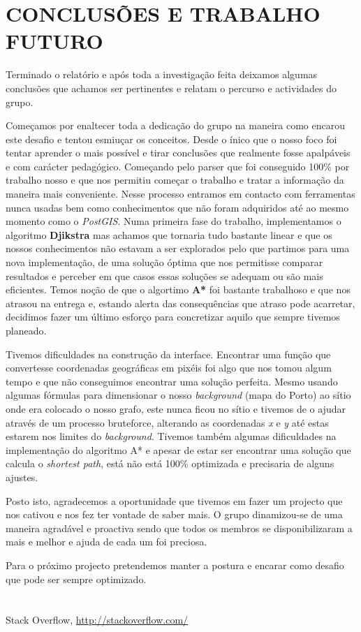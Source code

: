 \documentclass[a4paper]{article}
\begin{document}
\section{CONCLUSÕES E TRABALHO FUTURO}

\begin{small}
Terminado o relatório e após toda a investigação feita deixamos algumas conclusões que achamos ser pertinentes e relatam o percurso e actividades do grupo.

Começamos por enaltecer toda a dedicação do grupo na maneira como encarou este desafio e tentou esmiuçar os conceitos. Desde o ínico que o nosso foco foi tentar aprender o mais possível e tirar conclusões que realmente fosse apalpáveis e com carácter pedagógico. Começando pelo parser que foi conseguido 100\% por trabalho nosso e que nos permitiu começar o trabalho e tratar a informação da maneira mais conveniente. Nesse processo entramos em contacto com ferramentas nunca usadas bem como conhecimentos que não foram adquiridos até ao mesmo momento como o \textit{PostGIS}. 
Numa primeira fase do trabalho, implementamos o algoritmo \textbf{Djikstra} mas achamos que tornaria tudo bastante linear e que os nossos conhecimentos não estavam a ser explorados pelo que partimos para uma nova implementação, de uma solução óptima que nos permitisse comparar resultados e perceber em que casos essas soluções se adequam ou são mais eficientes. 
Temos noção de que o algortimo \textbf{A*} foi bastante trabalhoso e que nos atrasou na entrega e, estando alerta das consequências que atraso pode acarretar, decidimos fazer um último esforço para concretizar aquilo que sempre tivemos planeado.

Tivemos dificuldades na construção da interface. Encontrar uma função que convertesse coordenadas geográficas em pixéis foi algo que nos tomou algum tempo e que não conseguimos encontrar uma solução perfeita. Mesmo usando algumas fórmulas para dimensionar o nosso \textit{background
} (mapa do Porto) ao sítio onde era colocado o nosso grafo, este nunca ficou no sítio e tivemos de o ajudar através de um processo bruteforce, alterando as coordenadas \textit{x} e \textit{y} até estas estarem nos limites do \textit{background}.
Tivemos também algumas dificuldades na implementação do algoritmo A* e apesar de estar ser encontrar uma solução que calcula o \textit{shortest path}, está não está 100\% optimizada e precisaria de alguns ajustes. 

Posto isto, agradecemos a oportunidade que tivemos em fazer um projecto que nos cativou e nos fez ter vontade de saber mais. O grupo dinamizou-se de uma maneira agradável e proactiva sendo que todos os membros se disponibilizaram a mais e melhor e ajuda de cada um foi preciosa.

Para o próximo projecto pretendemos manter a postura e encarar como desafio que pode ser sempre optimizado. 
\end{small}

\section{}

\begin{thebibliography}{9}

  Stack Overflow, \url{http://stackoverflow.com/}

\end{thebibliography}
\end{document}
